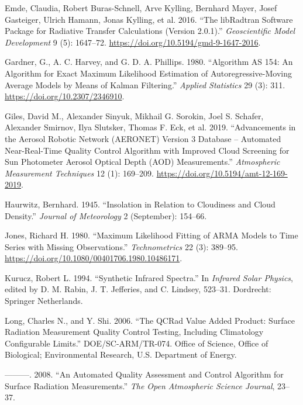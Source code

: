 \documentclass[
]{article}
\newlength{\cslhangindent}
\newlength{\cslentryspacingunit} %
\newenvironment{CSLReferences}[2] %
 {%
  \setlength{\parindent}{0pt}
  \ifodd #1
  \let\oldpar\par
  \def\par{\hangindent=\cslhangindent\oldpar}
  \fi
  \setlength{\parskip}{#2\cslentryspacingunit}
 }%
 {}
\begin{document}
\begin{CSLReferences}{1}{0}
\leavevmode{}%
Emde, Claudia, Robert Buras-Schnell, Arve Kylling, Bernhard Mayer, Josef Gasteiger, Ulrich Hamann, Jonas Kylling, et al. 2016. {``The {libRadtran} Software Package for Radiative Transfer Calculations (Version 2.0.1).''} \emph{Geoscientific Model Development} 9 (5): 1647--72. \url{https://doi.org/10.5194/gmd-9-1647-2016}.

\leavevmode{}%
Gardner, G., A. C. Harvey, and G. D. A. Phillips. 1980. {``Algorithm {AS} 154: An Algorithm for Exact Maximum Likelihood Estimation of Autoregressive-Moving Average Models by Means of Kalman Filtering.''} \emph{Applied Statistics} 29 (3): 311. \url{https://doi.org/10.2307/2346910}.

\leavevmode{}%
Giles, David M., Alexander Sinyuk, Mikhail G. Sorokin, Joel S. Schafer, Alexander Smirnov, Ilya Slutsker, Thomas F. Eck, et al. 2019. {``Advancements in the Aerosol Robotic Network ({AERONET}) Version 3 Database -- Automated Near-Real-Time Quality Control Algorithm with Improved Cloud Screening for Sun Photometer Aerosol Optical Depth ({AOD}) Measurements.''} \emph{Atmospheric Measurement Techniques} 12 (1): 169--209. \url{https://doi.org/10.5194/amt-12-169-2019}.

\leavevmode{}%
Haurwitz, Bernhard. 1945. {``Insolation in {Relation} to {Cloudiness} and {Cloud} {Density}.''} \emph{Journal of Meteorology} 2 (September): 154--66.

\leavevmode{}%
Jones, Richard H. 1980. {``Maximum Likelihood Fitting of {ARMA} Models to Time Series with Missing Observations.''} \emph{Technometrics} 22 (3): 389--95. \url{https://doi.org/10.1080/00401706.1980.10486171}.

\leavevmode{}%
Kurucz, Robert L. 1994. {``Synthetic Infrared Spectra.''} In \emph{Infrared Solar Physics}, edited by D. M. Rabin, J. T. Jefferies, and C. Lindsey, 523--31. Dordrecht: Springer Netherlands.

\leavevmode{}%
Long, Charles N., and Y. Shi. 2006. {``The QCRad Value Added Product: Surface Radiation Measurement Quality Control Testing, Including Climatology Configurable Limits.''} DOE/SC-ARM/TR-074. Office of Science, Office of Biological; Environmental Research, U.S. Department of Energy.

\leavevmode{}%
---------. 2008. {``An Automated Quality Assessment and Control Algorithm for Surface Radiation Measurements.''} \emph{The Open Atmospheric Science Journal}, 23--37.


\end{CSLReferences}
\end{document}
